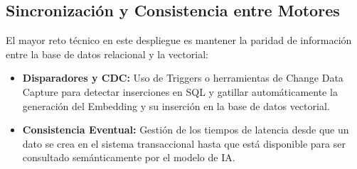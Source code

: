 \documentclass[12pt,a4paper,openany,oneside]{book}
\begin{document}
\subsection{Sincronización y Consistencia entre Motores}
El mayor reto técnico en este despliegue es mantener la paridad de información entre la base de datos relacional y la vectorial:
\begin{itemize}
    \item \textbf{Disparadores y CDC:} Uso de Triggers o herramientas de Change Data Capture para detectar inserciones en SQL y gatillar automáticamente la generación del Embedding y su inserción en la base de datos vectorial.
    \item \textbf{Consistencia Eventual:} Gestión de los tiempos de latencia desde que un dato se crea en el sistema transaccional hasta que está disponible para ser consultado semánticamente por el modelo de IA.
\end{itemize}
\end{document}
